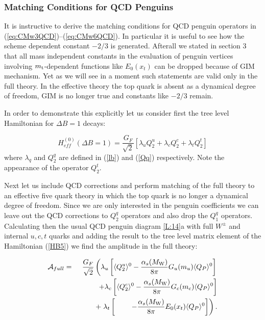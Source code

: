 \documentclass[12pt,rotate]{article}
\def\as{\alpha_s}
\newcommand{\mt}{m_{\rm t}}
\newcommand{\mw}{M_{\rm W}}
\begin{document}
\begin{itemize}
\begin{itemize}
\subsubsection{Matching Conditions for QCD Penguins}
It is instructive to derive the matching conditions for 
QCD penguin operators in (\ref{eq:CMw3QCD})--(\ref{eq:CMw6QCD}). 
In particular it is useful to
see how the scheme dependent constant $-2/3$ is generated.
Afterall we stated in section 3 that all mass independent
constants in the evaluation of penguin vertices involving
$\mt$-dependent functions like $E_0(x_t)$ can be dropped
because of GIM mechanism. Yet as we will see in a moment
such statements are valid only  in the full theory. In the effective
theory the top quark is absent as a dynamical degree of freedom,
GIM is no longer true and constants like $-2/3$ remain. 

In order to demonstrate this explicitly let us consider first
the tree level Hamiltonian for $\Delta B=1$ decays:

\begin{equation}\label{HB5}
H^{(0)}_{eff}(\Delta B=1)=\frac{G_F}{\sqrt{2}}
\left[\lambda_u Q^u_2
+\lambda_c Q^c_2
+\lambda_t Q^t_2 \right]
\end{equation}
where $\lambda_q$ and $Q^q_2$  are defined in (\ref{lb}) and (\ref{Qq})
respectively. Note the appearance of the operator $Q^t_2$.

Next let us include QCD corrections and perform matching of the
full theory to an effective five quark theory in which the top
quark is no longer a dynamical degree of freedom. Since we are
only interested in the penguin coefficients we can leave out
the QCD corrections to $Q^q_2$ operators and also drop the
$Q^q_1$ operators. Calculating then the usual QCD penguin diagram
\ref{L:14}a
with full $W^\pm$ and internal $u,c,t$ quarks and adding the result
to the tree level matrix element of the Hamiltonian (\ref{HB5})
we find the amplitude in the full theory:

\begin{eqnarray}\label{AMPFULL} 
{\cal A}_{full} & = &
\frac{G_F}{\sqrt{2}} 
 \left( \lambda_u \left[\langle Q^u_2 \rangle^0  
 -\frac{\as(\mw)}{8\pi} G_u(m_u) \langle Q_P\rangle ^0\right] \right.
\nonumber\\ 
&& ~~~~~~~+ \lambda_c \left[\langle Q^c_2 \rangle^0  
 -\frac{\as(\mw)}{8\pi} G_c(m_c) \langle Q_P\rangle ^0\right] 
\nonumber\\ 
&& ~~~~~~~+ \left.\lambda_t 
\left[~~~~~~~-\frac{\as(\mw)}{8\pi} E_0(x_t) 
\langle Q_P\rangle ^0\right] \right).
\end{eqnarray} 


\end{itemize}
\end{itemize}
\end{document}
